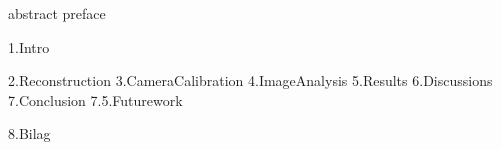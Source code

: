 \documentclass[12pt,a4paper]{article}
\begin{document}
\thispagestyle{plain}

\iffalse
\begin{figure}[H]
\centering
    \texttt{[image: pdf-filer/HomeAssignment2FrontPage.pdf]}
\end{figure}
\fi


\newpage
{abstract}
{preface}
\cleardoublepage{}
\clearpage
\tableofcontents

\listoffigures
\newpage
{1.Intro}


\newpage
{2.Reconstruction}
{3.CameraCalibration}
{4.ImageAnalysis}
{5.Results}
{6.Discussions}
{7.Conclusion}
{7.5.Futurework}
\newpage

% 



\newpage
{8.Bilag}
\end{document}
